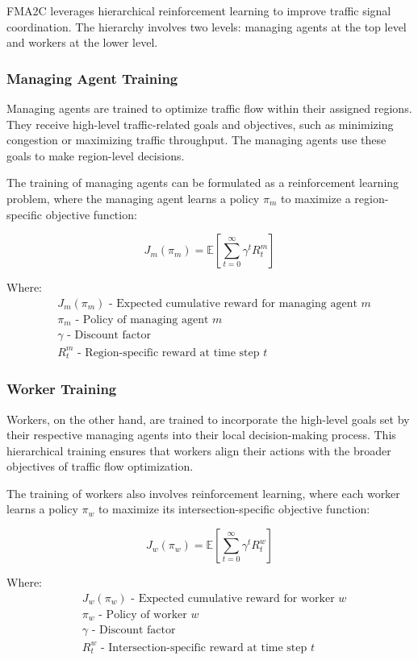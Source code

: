 FMA2C leverages hierarchical reinforcement learning to improve traffic signal coordination. The hierarchy involves two levels: managing agents at the top level and workers at the lower level.

\subsubsection{Managing Agent Training}

Managing agents are trained to optimize traffic flow within their assigned regions. They receive high-level traffic-related goals and objectives, such as minimizing congestion or maximizing traffic throughput. The managing agents use these goals to make region-level decisions.

The training of managing agents can be formulated as a reinforcement learning problem, where the managing agent learns a policy \(\pi_m\) to maximize a region-specific objective function:

\[
J_m(\pi_m) = \mathbb{E}\left[\sum_{t=0}^{\infty} \gamma^t R_t^m\right]
\]

Where:
\begin{align*}
    &J_m(\pi_m) \text{ - Expected cumulative reward for managing agent } m\\
    &\pi_m \text{ - Policy of managing agent } m\\
    &\gamma \text{ - Discount factor}\\
    &R_t^m \text{ - Region-specific reward at time step } t
\end{align*}

\subsubsection{Worker Training}

Workers, on the other hand, are trained to incorporate the high-level goals set by their respective managing agents into their local decision-making process. This hierarchical training ensures that workers align their actions with the broader objectives of traffic flow optimization.

The training of workers also involves reinforcement learning, where each worker learns a policy \(\pi_w\) to maximize its intersection-specific objective function:

\[
J_w(\pi_w) = \mathbb{E}\left[\sum_{t=0}^{\infty} \gamma^t R_t^w\right]
\]

Where:
\begin{align*}
    &J_w(\pi_w) \text{ - Expected cumulative reward for worker } w\\
    &\pi_w \text{ - Policy of worker } w\\
    &\gamma \text{ - Discount factor}\\
    &R_t^w \text{ - Intersection-specific reward at time step } t
\end{align*}

